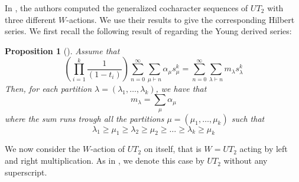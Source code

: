 \documentclass{article}
\newtheorem{proposition}[theorem]{Proposition}
\begin{document}
In \cite{MR25a}, the authors computed the generalized cocharacter sequences of $UT_2$ with three different $W$-actions. We use their results to give the corresponding Hilbert series. We first recall the following result of \cite{Reg94} regarding the Young derived series:

\begin{proposition}[\cite{Reg94}]\label{prop: young}
	Assume that
	\[ \left(\prod_{i=1}^{k}\frac{1}{(1-t_i)}\right) \sum_{n=0}^{\infty}\sum_{\mu\vdash n} \alpha_\mu s^k_\mu = \sum_{n=0}^{\infty}\sum_{\lambda\vdash n} m_\lambda s^k_\lambda  \]
	Then, for each partition $\lambda=(\lambda_1,\dots,\lambda_k)$, we have that
	\[ m_\lambda = \sum_\mu \alpha_\mu \]
	where the sum runs trough all the partitions $\mu=(\mu_1,\dots,\mu_k)$ such that 
	\[ \lambda_{1} \geq \mu_1 \geq \lambda_{2} \geq \mu_2 \geq\dots\geq \lambda_{k} \geq \mu_k \]
\end{proposition}

We now consider the $W$-action of $UT_2$ on itself, that is $W=UT_2$ acting by left and right multiplication. As in \cite{MR25a}, we denote this case by $UT_2$ without any superscript.
\end{document}
